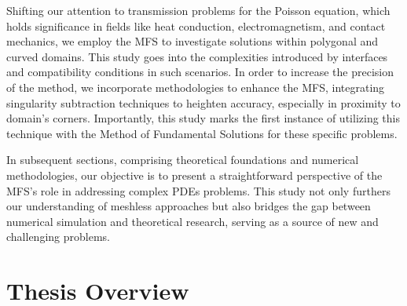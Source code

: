 Shifting our attention to transmission problems for the Poisson equation, which holds significance in fields like heat conduction, electromagnetism, and contact mechanics, we employ the \ac{MFS} to investigate solutions within polygonal and curved domains. This study goes into the complexities introduced by interfaces and compatibility conditions in such scenarios. In order to increase the precision of the method, we incorporate methodologies to enhance the \ac{MFS}, integrating singularity subtraction techniques to heighten accuracy, especially in proximity to domain's corners. Importantly, this study marks the first instance of utilizing this technique with the Method of Fundamental Solutions for these specific problems.

In subsequent sections, comprising theoretical foundations and numerical methodologies, our objective is to present a straightforward perspective of the \ac{MFS}'s role in addressing complex \acp{PDE} problems. This study not only furthers our understanding of meshless approaches but also bridges the gap between numerical simulation and theoretical research, serving as a source of new and challenging problems.






\section{Thesis Overview}

